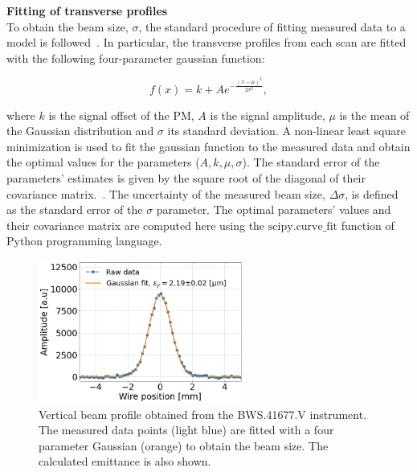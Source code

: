 \normalsize{\textbf{Fitting of transverse profiles}}\\
To obtain the beam size, $\sigma$, the standard procedure of fitting measured data to a model is followed~\cite{gaus_fit_least_squares}. In particular, the transverse profiles from each scan are fitted with the following four-parameter gaussian function:

\begin{equation}\label{eq:4p_gauss}
   f(x) = k + A e^{-\frac{(x-\mu)^2}{2 \sigma^2}},
\end{equation}

where $k$ is the signal offset of the PM, $A$ is the signal amplitude, $\mu$ is the mean of the Gaussian distribution and $\sigma$ its standard deviation. A non-linear least square minimization is used to fit the gaussian function to the measured data and obtain the optimal values for the parameters ($A, k, \mu, \sigma$). The standard error of the parameters' estimates is given by the square root of the diagonal of their covariance matrix.~\cite{gaus_fit_least_squares}. The uncertainty of the measured beam size, $\Delta \sigma$, is defined as the standard error of the $\sigma$ parameter. The optimal parameters' values and their covariance matrix are computed here using the $\mathrm{scipy.curve \_ fit}$ \cite{scipy_curve_fit} function of Python programming language. 


\begin{figure}[!h]
   \centering         
   \includegraphics[width=0.6\textwidth]{images/Ch4/SPS.BWS.41677.V_ROT_2018-09-05 15_45_01.33500_raw_and_fit.png}
       \caption{Vertical beam profile obtained from the BWS.41677.V instrument. The measured data points (light blue) are fitted with a four parameter Gaussian (orange) to obtain the beam size. The calculated emittance is also shown.}
       \label{fig:WS_example_V_profile}
\end{figure}
   

